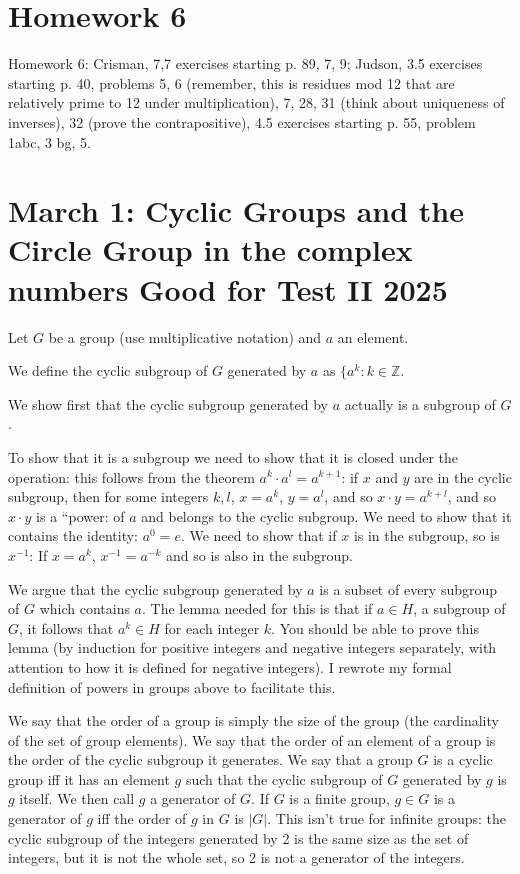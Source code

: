 \documentclass[12pt]{article}
\begin{document}
\newpage

\section{Homework 6}

Homework 6:  Crisman, 7,7 exercises starting p. 89, 7, 9;  Judson, 3.5 exercises starting p. 40, problems 5, 6 (remember, this is residues mod 12 that are relatively prime to 12 under multiplication), 7, 28, 31 (think about uniqueness of inverses), 32 (prove the contrapositive), 4.5 exercises starting p. 55, problem 1abc, 3 bg, 5.

\section{March 1:  Cyclic Groups and the Circle Group in the complex numbers  Good for Test II 2025}

Let $G$ be a group (use multiplicative notation) and $a$ an element.  

We define the cyclic subgroup of $G$ generated by $a$ as $\{a^k:k \in {\mathbb Z}$.

We show first that the cyclic subgroup generated by $a$ actually is a subgroup of $G$.

To show that it is a subgroup we need to show that it is closed under the operation:  this follows from the theorem $a^k \cdot a^l = a^{k+1}$:  if $x$ and $y$ are in the cyclic subgroup, then for some integers $k,l$, $x=a^k$, $y=a^l$, and so $x\cdot y = a^{k+l}$, and so $x\cdot y$ is a ``power: of $a$ and belongs to the cyclic subgroup.   We need to show that it contains the identity:  $a^0 = e$.  We need to show that if $x$ is in the subgroup, so is $x^{-1}$:  If $x=a^k$, $x^{-1} = a^{-k}$ and so is also in the subgroup.

We argue that the cyclic subgroup generated by $a$ is a subset of every subgroup of $G$ which contains $a$.  The lemma needed for this is that if $a \in H$, a subgroup of $G$, it follows that $a^k \in H$ for each integer $k$.  You should be able to prove this lemma (by induction for positive integers and negative integers separately, with attention to how it is defined for negative integers).  I rewrote my formal definition of powers in groups above to facilitate this.

We say that the order of a group is simply the size of the group (the cardinality of the set of group elements).  We say that the order of an element of a group is the order of the cyclic subgroup it generates.  We say that a group $G$ is a cyclic group iff it has an element $g$ such that the cyclic subgroup of $G$ generated by $g$ is $g$ itself.  We then call $g$ a generator of $G$.  If $G$ is a finite group, $g \in G$ is a generator of $g$ iff the order of $g$ in $G$ is $|G|$.  This isn't true for infinite groups:  the cyclic subgroup of the integers generated by 2 is the same size as the set of integers, but it is not the whole set, so 2 is not a generator of the integers.
\end{document}

